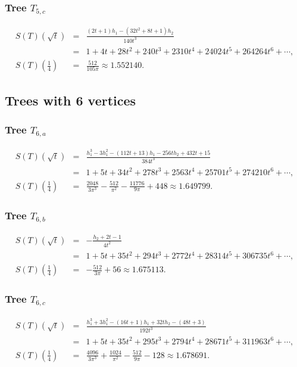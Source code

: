 \documentclass[12pt]{amsart}
\theoremstyle{plain}
\theoremstyle{remark}
\begin{document}
\subsubsection{Tree $T_{5,c}$}\label{sec:star_s=4}
\begin{eqnarray*}
S(T)(\sqrt{t}) 
& = & 
\frac{
\left(2 t +1\right)
h_1 
- 
\left(32 t^{2}+8 t +1\right)
h_2}{140 t^{3}} \\
& = & 
1+4 t +28 t^{2}+240 t^{3}+2310 t^{4}+24024 t^{5}+264264 t^{6}+ \cdots, \\
S(T)\left( \frac14\right)
& = & 
\frac{512}{105 \pi} 
\approx 1.552140
.
\end{eqnarray*}


\medskip 
\subsection{Trees with 6 vertices}
\subsubsection{Tree $T_{6,a}$}
\begin{eqnarray*}
S(T)(\sqrt{t}) 
& = & 
\frac{
h_1^{3}
-3 h_1^{2}
- \left(112 t +13\right) h_1 
-256 t h_2  +432 t +15}{384 t^{3}}
 \\
& = & 
1+5 t +34 t^{2}+278 t^{3}+2563 t^{4}+25701 t^{5}+274210 t^{6}+ \cdots,\\
S(T)\left( \frac14\right)
& = & 
\frac{2048}{3 \pi^{3}}-\frac{512}{\pi^{2}}-\frac{11776}{9 \pi}+448
\approx 1.649799
 .
\end{eqnarray*}


\subsubsection{Tree $T_{6,b}$}
\begin{eqnarray*}
S(T)(\sqrt{t}) 
& = & 
-\frac{h_2+2 t -1}{4 t^{2}}
 \\
& = & 
1+5 t +35 t^{2}+294 t^{3}+2772 t^{4}+28314 t^{5}+306735 t^{6}+\cdots,\\
S(T)\left( \frac14\right)
& = & 
-\frac{512}{3 \pi} + 56
\approx 1.675113
 .
\end{eqnarray*}

\subsubsection{Tree $T_{6,c}$} \label{ssec:T6c}
\begin{eqnarray*}
S(T)(\sqrt{t}) 
& = & 
\frac{ h_1^{3}+3 h_1^{2}- \left(16 t +1\right) h_1 +32 t h_2 -(48 t +3)}{192 t^{3}}
 \\
& = & 
1+5 t +35 t^{2}+295 t^{3}+2794 t^{4}+28671 t^{5}+311963 t^{6}+\cdots, \\
S(T)\left( \frac14\right)
& = & 
\frac{4096}{3 \pi^{3}}+\frac{1024}{\pi^{2}}-\frac{512}{9 \pi}-128
\approx 1.678691
 .
\end{eqnarray*}
\end{document}
